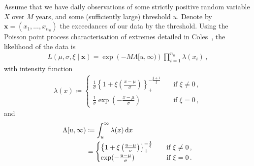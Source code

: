 \documentclass{article}
\newcommand{\dd}{{\rm d}}
\begin{document}
%
Assume that we have daily observations
of some strictly positive random variable $X$ over $M$ years,
and some (sufficiently large) threshold $u$.
Denote by $\mathbf{x}=( x_1, \dots, x_{n_u})$
the exceedances of our data by the threshold.
Using the Poisson point process characterisation
of extremes detailed in Coles~\cite{coles2001},
the likelihood of the data is
%
\begin{align}
	L(\mu, \sigma, \xi \mid \mathbf{x})
		= \exp \left(-M \Lambda[u, \infty)\right)
		\prod_{i = 1}^{n_u} \lambda(x_i) \,,
	\label{eq:likelihood}
\end{align}
%
with intensity function
%
\begin{align}
	\lambda(x) \coloneqq
	\begin{cases}
		\frac{1}{\sigma}
			\left\{1 + \xi \left(\frac{x - \mu}{\sigma}\right)\right\}_+
			^ {-\frac{\xi + 1}{\xi}}
			&\quad \text{if $\xi \neq 0$} \,,\\
		\frac{1}{\sigma}\exp(-\frac{x - \mu}{\sigma})
			&\quad \text{if $\xi = 0$} \,,
	\end{cases}
	\label{eq:GP}
\end{align}
%
and
% 
\begin{align}
	\Lambda[u, \infty) &\coloneqq \int_u ^ \infty \lambda(x) \, \dd x \\
	&=
		\begin{cases}
			\left\{1 + \xi \left(\frac{u - \mu}{\sigma}\right)\right\}_+
			^ {-\frac{1}{\xi}}
			&\quad \text{if $\xi \neq 0$} \,,\\
			\exp(-\frac{u - \mu}{\sigma})
			&\quad \text{if $\xi = 0$} \,.
		\end{cases}
	\label{eq:Lambda}
\end{align}
%
\end{document}

